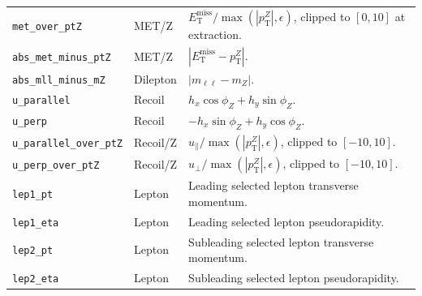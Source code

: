 \documentclass[11pt,a4paper,twocolumn]{article}
\newcommand{\MET}{\ensuremath{E_{\mathrm{T}}^{\mathrm{miss}}}}
\begin{document}
\begin{table}[h]
\begin{tabular}{L{0.18\textwidth}L{0.16\textwidth}L{0.58\textwidth}}
\texttt{met\_over\_ptZ} & MET/Z & \(\MET/\max(|p_{\mathrm{T}}^Z|,\epsilon)\), clipped to \([0,10]\) at extraction. \\
\texttt{abs\_met\_minus\_ptZ} & MET/Z & \(|\MET-p_{\mathrm{T}}^Z|\). \\
\texttt{abs\_mll\_minus\_mZ} & Dilepton & \(|m_{\ell\ell}-m_Z|\). \\
\texttt{u\_parallel} & Recoil & \(h_x\cos\phi_Z+h_y\sin\phi_Z\). \\
\texttt{u\_perp} & Recoil & \(-h_x\sin\phi_Z+h_y\cos\phi_Z\). \\
\texttt{u\_parallel\_over\_ptZ} & Recoil/Z & \(u_{\parallel}/\max(|p_{\mathrm{T}}^Z|,\epsilon)\), clipped to \([-10,10]\). \\
\texttt{u\_perp\_over\_ptZ} & Recoil/Z & \(u_{\perp}/\max(|p_{\mathrm{T}}^Z|,\epsilon)\), clipped to \([-10,10]\). \\
\texttt{lep1\_pt} & Lepton & Leading selected lepton transverse momentum. \\
\texttt{lep1\_eta} & Lepton & Leading selected lepton pseudorapidity. \\
\texttt{lep2\_pt} & Lepton & Subleading selected lepton transverse momentum. \\
\texttt{lep2\_eta} & Lepton & Subleading selected lepton pseudorapidity. \\
\bottomrule
\end{tabular}
\end{table}
\end{document}
